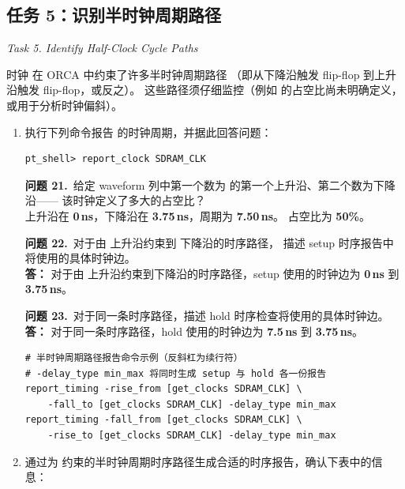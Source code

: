 \subsection{任务 5：识别半时钟周期路径}
\label{lab3:task5}

\noindent\textit{Task 5. Identify Half-Clock Cycle Paths}

时钟  在 ORCA 中约束了许多半时钟周期路径
（即从下降沿触发 flip-flop 到上升沿触发 flip-flop，或反之）。
这些路径须仔细监控（例如  的占空比尚未明确定义，或用于分析时钟偏斜）。

\begin{enumerate}
  \item 执行下列命令报告  的时钟周期，并据此回答问题：
\begin{lstlisting}
pt_shell> report_clock SDRAM_CLK
\end{lstlisting}

\begin{questionBox}
\textbf{问题 21.}\ 给定 waveform 列中第一个数为  的第一个上升沿、第二个数为下降沿——
该时钟定义了多大的占空比？\\[0.35em]
 上升沿在 \textbf{0\,ns}，下降沿在 \textbf{3.75\,ns}，周期为 \textbf{7.50\,ns}。
占空比为 \textbf{50\%}。

\textbf{问题 22.}\ 对于由  上升沿约束到  下降沿的时序路径，
描述 setup 时序报告中将使用的具体时钟边。\\[0.35em]
\textbf{答：} 对于由  上升沿约束到下降沿的时序路径，setup 使用的时钟边为 \textbf{0\,ns} 到 \textbf{3.75\,ns}。

\textbf{问题 23.}\ 对于同一条时序路径，描述 hold 时序检查将使用的具体时钟边。\\[0.35em]
\textbf{答：} 对于同一条时序路径，hold 使用的时钟边为 \textbf{7.5\,ns} 到 \textbf{3.75\,ns}。
\begin{lstlisting}
# 半时钟周期路径报告命令示例（反斜杠为续行符）
# -delay_type min_max 将同时生成 setup 与 hold 各一份报告
report_timing -rise_from [get_clocks SDRAM_CLK] \
    -fall_to [get_clocks SDRAM_CLK] -delay_type min_max
report_timing -fall_from [get_clocks SDRAM_CLK] \
    -rise_to [get_clocks SDRAM_CLK] -delay_type min_max
\end{lstlisting}
\end{questionBox}

  \item 通过为  约束的半时钟周期时序路径生成合适的时序报告，确认下表中的信息：


\end{enumerate}
